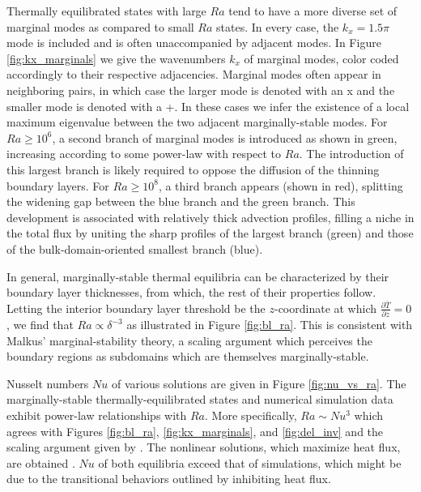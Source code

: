 \documentclass[reprint,amsmath,amssymb,aps]{revtex4-1}
\begin{document}
Thermally equilibrated states with large $Ra$ tend to have a more diverse set of marginal modes as compared to small $Ra$ states. In every case, the $k_x = 1.5\pi$ mode is included and is often unaccompanied by adjacent modes. In Figure \ref{fig:kx_marginals} we give the wavenumbers $k_x$ of marginal modes, color coded accordingly to their respective adjacencies. Marginal modes often appear in neighboring pairs, in which case the larger mode is denoted with an x and the smaller mode is denoted with a +. In these cases we infer the existence of a local maximum eigenvalue between the two adjacent marginally-stable modes. For $Ra \geq 10^6$, a second branch of marginal modes is introduced as shown in green, increasing according to some power-law with respect to $Ra$. The introduction of this largest branch is likely required to oppose the diffusion of the thinning boundary layers. For $Ra \geq 10^8$, a third branch appears (shown in red), splitting the widening gap between the blue branch and the green branch. This development is associated with relatively thick advection profiles, filling a niche in the total flux by uniting the sharp profiles of the largest branch (green) and those of the bulk-domain-oriented smallest branch (blue).

\par In general, marginally-stable thermal equilibria can be characterized by their boundary layer thicknesses, from which, the rest of their properties follow. Letting the interior boundary layer threshold be the $z$-coordinate at which $\frac{\partial \bar{T}}{\partial z} = 0$, we find that $Ra \propto  \delta^{-3}$ as illustrated in Figure \ref{fig:bl_ra}. This is consistent with Malkus' marginal-stability theory, a scaling argument which perceives the boundary regions as subdomains which are themselves marginally-stable.

Nusselt numbers $Nu$ of various solutions are given in Figure \ref{fig:nu_vs_ra}. The marginally-stable thermally-equilibrated states and numerical simulation data exhibit power-law relationships with $Ra$. More specifically, $Ra \sim Nu^3$ which agrees with Figures \ref{fig:bl_ra}, \ref{fig:kx_marginals}, and \ref{fig:del_inv} and the scaling argument given by \cite{Malkus}. The nonlinear solutions, which maximize heat flux, are obtained \cite{Waleffe}. $Nu$ of both equilibria exceed that of simulations, which might be due to the transitional behaviors outlined by \cite{Yalniz} inhibiting heat flux.
\end{document}

